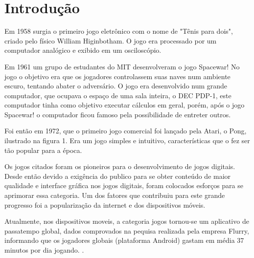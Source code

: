\chapter{Introdução}
\label{cap:introducao}
 
 
Em 1958 surgia o primeiro jogo eletrônico com o nome de "Tênis para dois", criado pelo físico William Higinbotham. O jogo era processado por um computador analógico e exibido em um osciloscópio.
\cite{mass}


Em 1961 um grupo de estudantes do MIT desenvolveram o jogo Spacewar! No jogo o objetivo era que os jogadores controlassem suas naves num ambiente escuro, tentando abater o adversário. O jogo era desenvolvido num grande computador, que ocupava o espaço de uma sala inteira, o DEC PDP-1, este computador tinha como objetivo executar cálculos em geral, porém, após o jogo Spacewar! o computador ficou famoso pela possibilidade de entreter outros. \cite{ram}


Foi então em 1972, que o primeiro jogo comercial foi lançado pela Atari, o Pong, ilustrado na figura 1. Era um jogo simples e intuitivo, características que o fez ser tão popular para a época. \cite{tracc} 

\begin{figure}[h!]
		\centering
	\end{figure}

Os jogos citados foram os pioneiros para o desenvolvimento de jogos digitais. Desde então devido a exigência do publico para se obter conteúdo de maior qualidade e interface gráfica nos jogos digitais, foram colocados esforços para se aprimorar essa categoria. Um dos fatores que contribuiu para este grande progresso foi a popularização da internet e dos dispositivos móveis.

Atualmente, nos dispositivos moveis, a categoria jogos tornou-se um aplicativo de passatempo global, dados comprovados na pequisa realizada pela empresa Flurry, informando que os jogadores globais (plataforma Android) gastam em média 37 minutos por dia jogando. \cite{flur}. 

